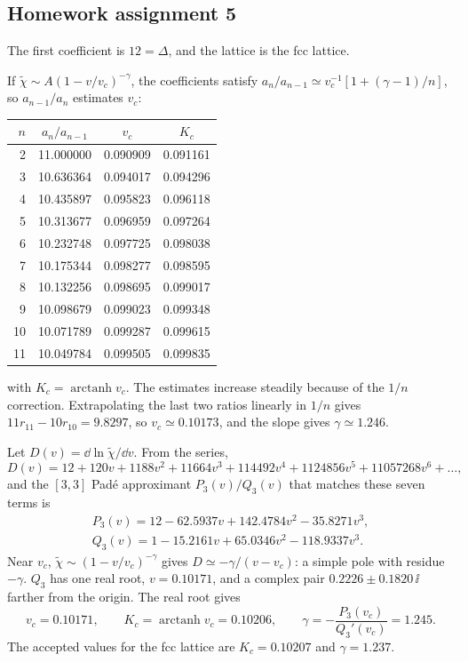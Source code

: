 \subsection{Homework assignment 5}

The first coefficient is $12 = \Delta$, and the lattice is the fcc lattice.

 If $\tilde\chi\sim A(1-v/v_c)^{-\gamma}$, the coefficients satisfy
$a_n/a_{n-1}\simeq v_c^{-1}\left[1+(\gamma-1)/n\right]$, so $a_{n-1}/a_n$ estimates $v_c$:
\begin{center}
\small
\renewcommand{\arraystretch}{1.15}
\begin{tabular}{rccc}
  $n$ & $a_n/a_{n-1}$ & $v_c$ & $K_c$\\ \hline
  2 & 11.000000 & 0.090909 & 0.091161\\
  3 & 10.636364 & 0.094017 & 0.094296\\
  4 & 10.435897 & 0.095823 & 0.096118\\
  5 & 10.313677 & 0.096959 & 0.097264\\
  6 & 10.232748 & 0.097725 & 0.098038\\
  7 & 10.175344 & 0.098277 & 0.098595\\
  8 & 10.132256 & 0.098695 & 0.099017\\
  9 & 10.098679 & 0.099023 & 0.099348\\
  10 & 10.071789 & 0.099287 & 0.099615\\
  11 & 10.049784 & 0.099505 & 0.099835
\end{tabular}
\end{center}
with $K_c = \operatorname{arctanh}v_c$. The estimates increase steadily because of the $1/n$ correction. Extrapolating
the last two ratios linearly in $1/n$ gives $11r_{11}-10r_{10} = 9.8297$, so $v_c\simeq 0.10173$, and the slope gives
$\gamma\simeq 1.246$.

 Let $D(v) = \dd\ln\tilde\chi/\dd v$. From the series,
\begin{equation}
  D(v) = 12+120v+1188v^2+11664v^3+114492v^4+1124856v^5+11057268v^6+\ldots ,
\end{equation}
and the $[3,3]$ Pad\'e approximant $P_3(v)/Q_3(v)$ that matches these seven terms is
\begin{gather}
  P_3(v) = 12-62.5937v+142.4784v^2-35.8271v^3,\\
  Q_3(v) = 1-15.2161v+65.0346v^2-118.9337v^3 .
\end{gather}
Near $v_c$, $\tilde\chi\sim(1-v/v_c)^{-\gamma}$ gives $D\simeq-\gamma/(v-v_c)$: a simple pole with residue $-\gamma$.
$Q_3$ has one real root, $v = 0.10171$, and a complex pair $0.2226\pm 0.1820\,\ii$ farther from the origin. The real
root gives
\begin{equation}
  v_c = 0.10171,\qquad K_c = \operatorname{arctanh}v_c = 0.10206,\qquad
  \gamma = -\frac{P_3(v_c)}{Q_3'(v_c)} = 1.245 .
\end{equation}
The accepted values for the fcc lattice are $K_c = 0.10207$ and $\gamma = 1.237$.

